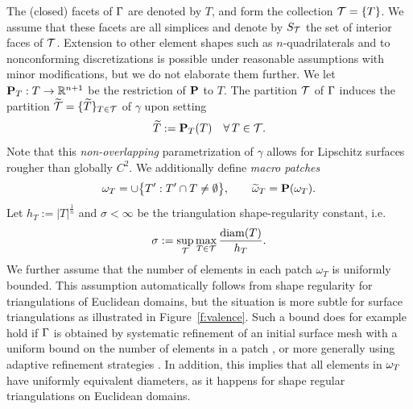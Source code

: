 The (closed) facets of $\Gamma$ are denoted by $T$, and form the collection $\mathcal{T}=\{T \}$.   We assume that these facets are all simplices and denote by $S_{\mathcal{T}}$ the set of interior faces of $\mathcal{T}$.  Extension to other element shapes such as $n$-quadrilaterals and to nonconforming discretizations is possible under reasonable assumptions with minor modifications, but we do not elaborate them further.  
We let ${\bf P}_T:T \rightarrow \mathbb R^{n+1}$ be
the restriction of ${\bf P}$ to $T$.
The partition $\mathcal{T}$ of $\Gamma$ induces the partition
$\widetilde{\mathcal{T}}=\{\widetilde{T}\}_{T \in \mathcal{T}}$ of $\gamma$ upon setting
%
\[
\widetilde{T} := {\bf P}_T(T)
\quad\forall \, T\in \mathcal{T}.
\]
Note that this \emph{non-overlapping} parametrization of $\gamma$ allows for Lipschitz surfaces rougher than globally $C^2$.  We additionally define {\it macro patches} 
%
\begin{equation}\label{patch}
\omega_T=\cup \big\{T': T' \cap T \neq \emptyset \big\},
\qquad
\widetilde{\omega}_T =  {\bf P}(\omega_T).
\end{equation}
%
Let $h_T := | T |^{\frac 1 n}$ and
$\sigma < \infty$ be the triangulation shape-regularity constant, i.e.
%
\begin{equation}\label{e:shape_reg}
\sigma:=\sup_{\mathcal{T}} \max_{T \in \mathcal{T}} \frac{{\rm diam}(T)}{h_T}.
\end{equation}
%
We further assume that the number of elements in each patch $\omega_T$ is uniformly bounded.  This assumption automatically follows from shape regularity for triangulations of Euclidean domains, but the situation is more subtle for surface triangulations as illustrated in Figure~\ref{f:valence}.  Such a bound does for example hold if $\Gamma$ is obtained by systematic refinement of an initial surface mesh with a uniform bound on the number of elements in a patch \cite{DemlowDziuk:07}, or more generally using adaptive refinement strategies \cite{BCMMN16,BCMN:Magenes}.  In addition, this implies that all elements in $\omega_T$ have uniformly equivalent diameters, as it happens for shape regular triangulations on Euclidean domains.

